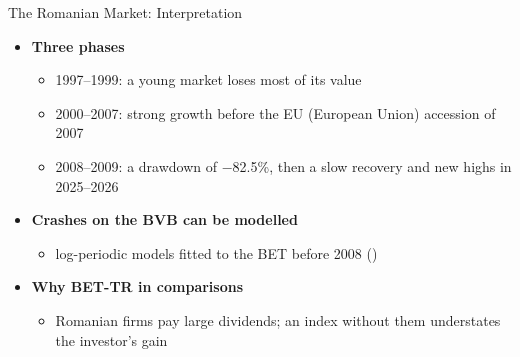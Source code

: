 \begin{frame}{The Romanian Market: Interpretation}
\itemsize{\small}
\begin{itemize}
    \item \textbf{Three phases}
    \begin{itemize}
        \item 1997--1999: a young market loses most of its value
        \item 2000--2007: strong growth before the EU (European Union) accession of 2007
        \item 2008--2009: a drawdown of \ensuremath{-}82.5\%, then a slow recovery and new highs in 2025--2026
    \end{itemize}
    \item \textbf{Crashes on the BVB can be modelled}
    \begin{itemize}
        \item log-periodic models fitted to the BET before 2008 ()
    \end{itemize}
    \item \textbf{Why BET-TR in comparisons}
    \begin{itemize}
        \item Romanian firms pay large dividends; an index without them understates the investor's gain
    \end{itemize}
\end{itemize}
\end{frame}

